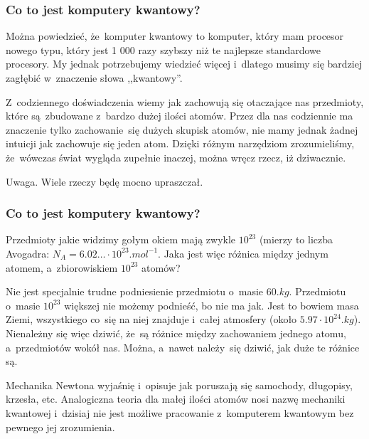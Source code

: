 \documentclass[10pt,t]{beamer}
\begin{document}
\begin{frame}
  \frametitle{Co to jest komputery kwantowy?}


  Można powiedzieć, że~komputer kwantowy to komputer, który mam
  procesor nowego typu, który jest 1 000 razy szybszy niż te najlepsze
  standardowe procesory. My jednak potrzebujemy wiedzieć więcej
  i~dlatego musimy się bardziej zagłębić w~znaczenie słowa
  ,,kwantowy''.

  Z~codziennego doświadczenia wiemy jak zachowują się otaczające nas
  przedmioty, które są~zbudowane z~bardzo dużej ilości atomów. Przez
  dla nas codziennie ma znaczenie tylko zachowanie~się dużych skupisk
  atomów, nie mamy jednak żadnej intuicji jak zachowuje się jeden
  atom. Dzięki różnym narzędziom zrozumieliśmy, że~wówczas świat
  wygląda zupełnie inaczej, można wręcz rzecz, iż dziwacznie.

  \alert{Uwaga.} Wiele rzeczy będę mocno upraszczał.

\end{frame}





\begin{frame}
  \frametitle{Co to jest komputery kwantowy?}


  Przedmioty jakie widzimy gołym okiem mają zwykle $10^{ 23 }$ (mierzy
  to liczba Avogadra:
  $N_{ A } = 6.02\ldots \cdot 10^{ 23 } \si{.mol}^{ -1 }$. Jaka jest więc
  różnica między jednym atomem, a~zbiorowiskiem $10^{ 23 }$ atomów?

  Nie jest specjalnie trudne podniesienie przedmiotu o~masie
  $60 \si{.kg}$. Przedmiotu o~masie $10^{ 23 }$ większej nie możemy
  podnieść, bo nie ma jak. Jest to bowiem masa Ziemi, wszystkiego
  co~się na niej znajduje i~całej atmosfery (około
  $5.97 \cdot 10^{ 24 } \si{.kg}$). Nienależny się więc dziwić, że~są
  różnice między zachowaniem jednego atomu, a~przedmiotów wokół nas.
  Można, a~nawet należy~się dziwić, jak duże te różnice są.

  Mechanika Newtona wyjaśnię i~opisuje jak poruszają się samochody,
  długopisy, krzesła, etc. Analogiczna teoria dla małej ilości atomów
  nosi nazwę mechaniki kwantowej i~dzisiaj nie jest możliwe pracowanie
  z~komputerem kwantowym bez pewnego jej zrozumienia.

\end{frame}
\end{document}
